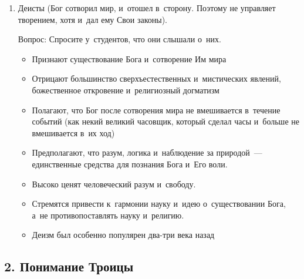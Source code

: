 \documentclass[a4paper,12pt]{article}
\begin{document}
\begin{enumerate}
    \item Деисты (Бог сотворил мир, и~отошел в~сторону. Поэтому не управляет творением, хотя и~дал ему Свои законы). 
    
    Вопрос: Спросите у~студентов, что они слышали о~них.
    \begin{itemize}
        \item Признают существование Бога и~сотворение Им мира
        \item Отрицают большинство сверхъестественных и~мистических явлений, божественное откровение и~религиозный догматизм
        \item Полагают, что Бог после сотворения мира не вмешивается в~течение событий (как некий великий часовщик, который сделал часы и~больше не вмешивается в~их ход) 
        \item Предполагают, что разум, логика и~наблюдение за природой~--- единственные средства для познания Бога и~Его воли. 
        \item Высоко ценят человеческий разум и~свободу. 
        \item Стремятся привести к~гармонии науку и~идею о~существовании Бога, а~не противопоставлять науку и~религию.
        \item Деизм был особенно популярен два-три века назад
    \end{itemize}

\end{enumerate}

        
\subsection{2. Понимание Троицы}        
            
\end{document}
